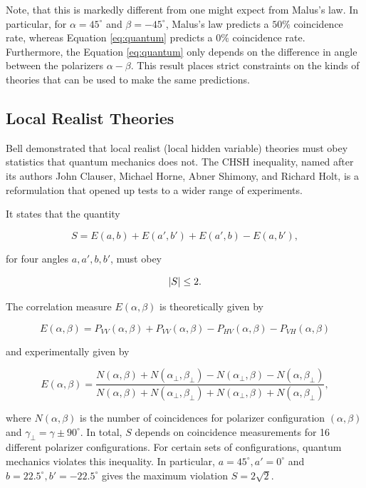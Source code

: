 \documentclass{article}
\let\Oldsubsection\subsection
\renewcommand{\subsection}{\FloatBarrier\Oldsubsection}
\begin{document}
Note, that this is markedly different from one might expect from Malus's law. In particular, for $\alpha = 45^\circ$ and $\beta = -45^\circ$, Malus's law predicts a $50\%$ coincidence rate, whereas Equation \ref{eq:quantum} predicts a $0\%$ coincidence rate. Furthermore, the Equation \ref{eq:quantum} only depends on the difference in angle between the polarizers $\alpha - \beta$. This result places strict constraints on the kinds of theories that can be used to make the same predictions.

\subsection{Local Realist Theories}

Bell demonstrated that local realist (local hidden variable) theories must obey statistics that quantum mechanics does not. The CHSH inequality, named after its authors John Clauser, Michael Horne, Abner Shimony, and Richard Holt, is a reformulation that opened up tests to a wider range of experiments.\cite{clauser}

It states that the quantity 

\begin{equation}
  S = E(a,b) + E(a', b') + E(a', b) - E(a, b'),
\end{equation}

for four angles $a,a',b,b'$, must obey

\begin{equation}
  \abs{S} \leq 2.\label{eq:s}
\end{equation}

The correlation measure $E(\alpha, \beta)$ is theoretically given by 

\begin{equation}
  E(\alpha, \beta) = P_{VV}(\alpha, \beta) + P_{VV}(\alpha, \beta) - P_{HV}(\alpha, \beta) - P_{VH}(\alpha, \beta)
\end{equation}

and experimentally given by

\begin{equation}
  E(\alpha, \beta) = \frac{N(\alpha, \beta) + N(\alpha_\perp, \beta_\perp) - N(\alpha_\perp, \beta) - N(\alpha, \beta_\perp)}{N(\alpha, \beta) + N(\alpha_\perp, \beta_\perp) + N(\alpha_\perp, \beta) + N(\alpha, \beta_\perp)}, \label{eq:test}
\end{equation} 

where $N(\alpha, \beta)$ is the number of coincidences for polarizer configuration $(\alpha, \beta)$ and $\gamma_\perp = \gamma \pm 90^\circ$. In total, $S$ depends on coincidence measurements for 16 different polarizer configurations. For certain sets of configurations, quantum mechanics violates this inequality.\cite{dehlinger} In particular, $a = 45^\circ, a' = 0^\circ$ and $b = 22.5^\circ, b' = -22.5^\circ$ gives the maximum violation $S = 2 \sqrt{2}$.
\end{document}
